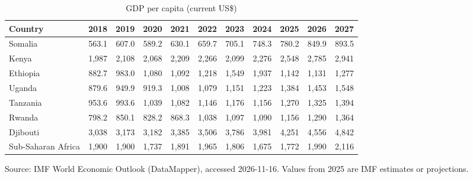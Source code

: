\begin{table}[htbp]\centering
\caption{GDP per capita (current US\$)}
\begin{tabular}{lrrrrrrrrrr}
\toprule
Country & 2018 & 2019 & 2020 & 2021 & 2022 & 2023 & 2024 & 2025 & 2026 & 2027 \\
\midrule
Somalia & 563.1 & 607.0 & 589.2 & 630.1 & 659.7 & 705.1 & 748.3 & 780.2 & 849.9 & 893.5 \\
Kenya & 1,987 & 2,108 & 2,068 & 2,209 & 2,266 & 2,099 & 2,276 & 2,548 & 2,785 & 2,941 \\
Ethiopia & 882.7 & 983.0 & 1,080 & 1,092 & 1,218 & 1,549 & 1,937 & 1,142 & 1,131 & 1,277 \\
Uganda & 879.6 & 949.9 & 919.3 & 1,008 & 1,079 & 1,151 & 1,223 & 1,384 & 1,453 & 1,548 \\
Tanzania & 953.6 & 993.6 & 1,039 & 1,082 & 1,146 & 1,176 & 1,156 & 1,270 & 1,325 & 1,394 \\
Rwanda & 798.2 & 850.1 & 828.2 & 868.3 & 1,038 & 1,097 & 1,090 & 1,156 & 1,290 & 1,364 \\
Djibouti & 3,038 & 3,173 & 3,182 & 3,385 & 3,506 & 3,786 & 3,981 & 4,251 & 4,556 & 4,842 \\
Sub-Saharan Africa & 1,900 & 1,900 & 1,737 & 1,891 & 1,965 & 1,806 & 1,675 & 1,772 & 1,990 & 2,116 \\
\bottomrule
\end{tabular}
\par\smallskip\footnotesize Source: IMF World Economic Outlook (DataMapper), accessed 2026-11-16. Values from 2025 are IMF estimates or projections.
\end{table}
